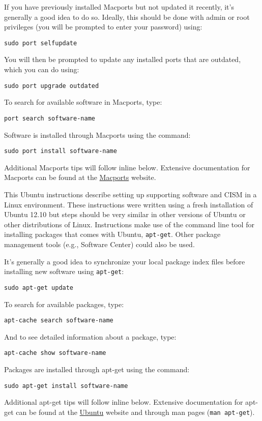 \begin{mdframed}[style=mac]
If you have previously installed Macports but not updated it recently, it's generally a good idea to do so. Ideally, this should be done with admin or root privileges (you will be prompted to enter your password) using:

\texttt{sudo port selfupdate}

You will then be prompted to update any installed ports that are outdated, which you can do using:

\texttt{sudo port upgrade outdated}

To search for available software in Macports, type: 

\texttt{port search software-name}

Software is installed through Macports using the command:

\texttt{sudo port install software-name}

Additional Macports tips will follow inline below. Extensive documentation for Macports 
can be found at the \href{http://guide.macports.org}{Macports} website.
\end{mdframed}              %


\begin{mdframed}[style=ubuntu] %
This Ubuntu instructions describe setting up supporting software and CISM in a Linux environment.
These instructions were written using a fresh installation of Ubuntu 12.10 but 
steps should be very similar in other versions of Ubuntu or other distributions of Linux.
Instructions make use of the command line tool for installing packages that comes with Ubuntu, 
\texttt{apt-get}.  Other package management tools (e.g., Software Center)
could also be used.

It's generally a good idea to synchronize your local package index files before
installing new software using \texttt{apt-get}:

\texttt{sudo apt-get update}

To search for available packages, type:

\texttt{apt-cache search software-name}

And to see detailed information about a package, type:

\texttt{apt-cache show software-name}

Packages are installed through apt-get using the command:

\texttt{sudo apt-get install software-name}

Additional apt-get tips will follow inline below. Extensive documentation for apt-get 
can be found at the \href{https://help.ubuntu.com/community/AptGet/Howto}{Ubuntu} website
and through man pages (\texttt{man apt-get}).
\end{mdframed}                 %



